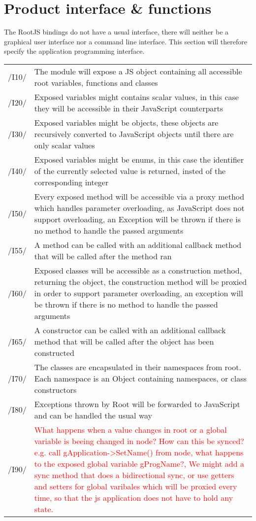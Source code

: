 \chapter{Product interface & functions}
The RootJS bindings do not have a usual interface, there will neither be a graphical user interface nor a command line interface.
This section will therefore specify the application programming interface.


\begin{longtable}{|p{1cm} | p{10cm}|}
   \hline
  /I10/ & The module will expose a JS object containing all accessible root variables, functions and classes \\
  /I20/ & Exposed variables might contains scalar values, in this case they will be accessible in their JavaScript counterparts \\
  /I30/ & Exposed variables might be objects, these objects are recursively converted to JavaScript objects until there are only scalar values \\
  /I40/ & Exposed variables might be enums, in this case the identifier of the currently selected value is returned, insted of the corresponding integer \\
  /I50/ & Every exposed method will be accessible via a proxy method which handles parameter overloading, as JavaScript does not support overloading, an Exception will be thrown if there is no method to handle the passed arguments \\
  /I55/ & A method can be called with an additional callback method that will be called after the method ran \\
  /I60/ & Exposed classes will be accessible as a construction method, returning the object, the construction method will be proxied in order to support parameter overloading, an exception will be thrown if there is no method to handle the passed arguments \\
  /I65/ & A constructor can be called with an additional callback method that will be called after the object has been constructed \\
  /I70/ & The classes are encapsulated in their namespaces from root. Each namespace is an Object containing namespaces, or class constructors \\
  /I80/ & Exceptions thrown by Root will be forwarded to JavaScript and can be handled the usual way \\
  /I90/ & \textcolor{red}{What happens when a value changes in root or a global variable is beeing changed in node? How can this be synced? e.g. call gApplication->SetName() from node, what happens to the exposed global variable gProgName?, We might add a sync method that does a bidirectional sync, or use getters and setters for global varibales which will be proxied every time, so that the js application does not have to hold any state.} \\
   \hline
\end{longtable}
